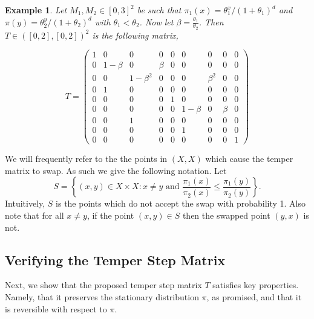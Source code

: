 \documentclass{amsart}
\newtheorem{example}[definition]{Example}
\newcommand{\1}{\mathbbm{1}}
\begin{document}
\begin{example}
    Let $M_1,M_2\in [0,3]^2$ be such that $\pi_1(x)=\theta_1^x/(1+\theta_1)^d$ and $\pi(y)=\theta_2^y/(1+\theta_2)^d$ with $\theta_1 < \theta_2$. Now let $\beta=\frac{\theta_1}{\theta_2}$. Then $T\in ([0,2],[0,2])^2$ is the following matrix,

    \[T=\begin{pmatrix}
        1 &   0     &   0     &   0     &   0     &   0     &   0     &   0     &    0\\%
        0 &1-\beta  &   0     & \beta   &   0     &   0     &   0     &   0     &    0\\%
        0 &   0     &1-\beta^2&   0     &   0     &   0     & \beta^2 &   0     &    0\\%
        0 &   1     &   0     &   0     &   0     &   0     &   0     &   0     &    0\\%
        0 &   0     &   0     &   0     &   1     &   0     &   0     &   0     &    0\\%
        0 &   0     &   0     &   0     &   0     & 1-\beta &   0     & \beta   &    0\\%
        0 &   0     &   1     &   0     &   0     &   0     &   0     &   0     &    0\\%
        0 &   0     &   0     &   0     &   0     &   1     &   0     &   0     &    0\\%
        0 &   0     &   0     &   0     &   0     &   0     &   0     &   0     &    1  %
    \end{pmatrix} \]
\end{example}    

We will frequently refer to the the points in $(X,X)$ which cause the temper matrix to swap. As such we give the following notation. Let 
\begin{equation}
S=\left\{(x,y)\in X\times X:x\neq y \text{ and }\frac{\pi_1(x)}{\pi_2(x)}\leq \frac{\pi_1(y)}{\pi_2(y)}\right\}.
\end{equation} 
Intuitively, $S$ is the points which do not accept the swap with probability 1. Also note that for all $x\neq y$, if the point $(x,y)\in S$ then the swapped point $(y,x)$ is not. 

\subsection{Verifying the Temper Step Matrix}
Next, we show that the proposed temper step matrix $T$ satisfies key properties. Namely, that it preserves the stationary distribution $\pi$, as promised, and that it is reversible with respect to $\pi$.
\end{document}

